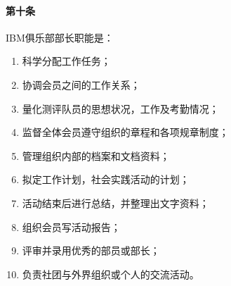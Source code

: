 \documentclass{club}
\begin{document}
\paragraph{第十条}IBM俱乐部部长职能是：
\begin{enumerate}
	\item 科学分配工作任务；
	\item 协调会员之间的工作关系；
	\item 量化测评队员的思想状况，工作及考勤情况；
	\item 监督全体会员遵守组织的章程和各项规章制度；
	\item 管理组织内部的档案和文档资料；
	\item 拟定工作计划，社会实践活动的计划；
	\item 活动结束后进行总结，并整理出文字资料；
	\item 组织会员写活动报告；
	\item 评审并录用优秀的部员或部长；
	\item 负责社团与外界组织或个人的交流活动。
\end{enumerate}
\end{document}
